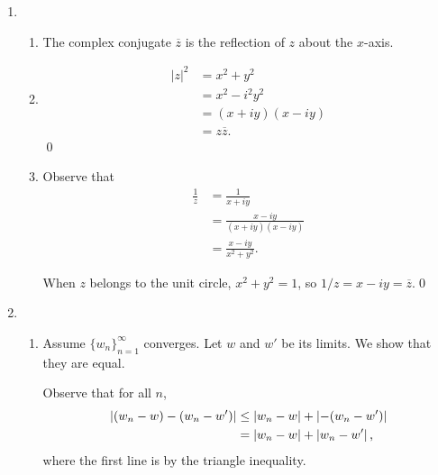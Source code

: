 \documentclass[oneside]{article}
\newcommand\abs[1]{\left|#1\right|}
\begin{document}
\begin{enumerate}[label=\textbf{\arabic*.}]
\begin{enumerate}[label=\textbf{(\alph*)}]
      Observing that the definition of $\abs{z}$ depends only on $x^2$ and
      $y^2$, $\abs{x-iy} = \abs{x + iy} = \abs{z}$. Observe also that
      $\abs{z}^2 = x^2 + y^2$ by squaring both sides of its definition. Then \[
        \abs{\frac{1}{z}} = \frac{1}{\abs{z}^2}\abs{z} = \frac{1}{\abs{z}}.
      \]
      \qed

  \end{enumerate}

  \item
  \begin{enumerate}[label=\textbf{(\alph*)}]
    \item The complex conjugate $\overline{z}$ is the reflection of $z$ about
      the $x$-axis.

    \item \begin{align*}
        \abs{z}^2 &= x^2 + y^2 \\
                  &= x^2 - i^2y^2 \\
                  &= (x + iy)(x - iy) \\
                  &= z\overline{z}\text{.}
      \end{align*}
      \qed

    \item
      Observe that \begin{align*}
        \frac{1}{z} &= \frac{1}{x + iy} \\
         &= \frac{x - iy}{(x + iy)(x - iy)} \\
         &= \frac{x - iy}{x^2 + y^2} \text{.}
      \end{align*}

      When $z$ belongs to the unit circle, $x^2 + y^2 = 1$, so
      $1/z = x - iy = \overline{z}$.\qed

  \end{enumerate}
  \item
  \begin{enumerate}[label=\textbf{(\alph*)}]
    \item Assume $\{w_n\}_{n=1}^\infty$ converges. Let $w$ and $w'$ be its
      limits. We show that they are equal.

      Observe that for all $n$, \begin{align*}
        \abs{(w_n - w) - (w_n - w')}
        &\leq \abs{w_n - w} + \abs{-(w_n - w')} \\
        &= \abs{w_n - w} + \abs{w_n - w'}\text,
      \end{align*} where the first line is by the triangle inequality.


\end{enumerate}
\end{enumerate}
\end{document}
